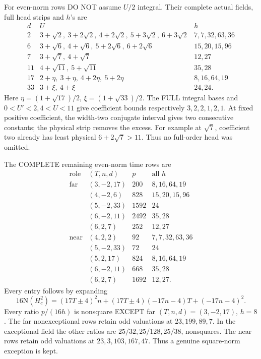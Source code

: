 \documentclass[11pt]{article}
\begin{document}
For even-norm rows DO NOT assume \(U/2\)
integral.
Their complete actual fields, full head strips
and \(h\)'s are
\[
\begin{array}{c|l|l}
 d&U&h\\ \hline
2&3+\sqrt2,\ 3+2\sqrt2,\ 4+2\sqrt2,\
     5+3\sqrt2,\ 6+3\sqrt2&7,7,32,63,36\\
6&3+\sqrt6,\ 4+\sqrt6,\ 5+2\sqrt6,\ 6+2\sqrt6&
     15,20,15,96\\
7&3+\sqrt7,\ 4+\sqrt7&12,27\\
11&4+\sqrt{11},\ 5+\sqrt{11}&35,28\\
17&2+\eta,\ 3+\eta,\ 4+2\eta,\ 5+2\eta&
      8,16,64,19\\
33&3+\xi,\ 4+\xi&24,24 .
\end{array}
\]
Here \(\eta=(1+\sqrt{17})/2\),
\(\xi=(1+\sqrt{33})/2\).
The FULL integral bases and \(0<U'<2,4<U<11\)
give coefficient bounds respectively
\(3,2,2,1,2,1\).
At fixed positive coefficient, the width-two
conjugate interval gives two consecutive constants;
the physical strip removes the excess.
For example at \(\sqrt7\), coefficient two
already has least physical \(6+2\sqrt7>11\).
Thus no full-order head was omitted.

The COMPLETE remaining even-norm time rows are
\[
\begin{array}{c|c|r|l}
 \text{role}&(T,n,d)&p&\text{all }h\\ \hline
 \text{far}&(3,-2,17)&200&8,16,64,19\\
 &(4,-2,6)&828&15,20,15,96\\
 &(5,-2,33)&1592&24\\
 &(6,-2,11)&2492&35,28\\
 &(6,2,7)&252&12,27\\
 \text{near}&(4,2,2)&92&7,7,32,63,36\\
 &(5,-2,33)&72&24\\
 &(5,2,17)&824&8,16,64,19\\
 &(6,-2,11)&668&35,28\\
 &(6,2,7)&1692&12,27 .
\end{array}
\]
Every entry follows by expanding
\[
16\mathrm N(H_c^2)
 =(17T\pm4)^2n+(17T\pm4)(-17n-4)T+(-17n-4)^2 .
\]
Every ratio \(p/(16h)\) is nonsquare EXCEPT
far \((T,n,d)=(3,-2,17)\), \(h=8\).
The far nonexceptional rows retain odd valuations
at \(23,199,89,7\).
In the exceptional field the other ratios are
\(25/32,25/128,25/38\), nonsquares.
The near rows retain odd valuations at
\(23,3,103,167,47\).
Thus a genuine square-norm exception is kept.
\end{document}
